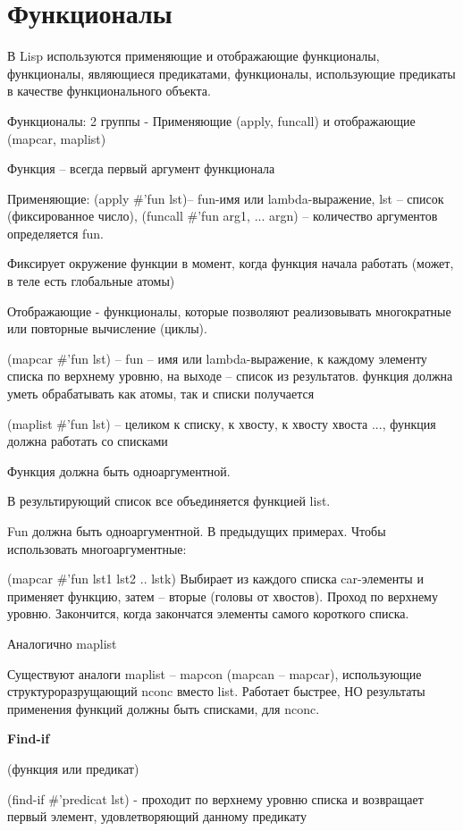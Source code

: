 \documentclass[12pt]{report}
\begin{document}
\section*{Функционалы}
 В Lisp используются применяющие и отображающие функционалы, функционалы, являющиеся предикатами, функционалы, использующие предикаты в качестве функционального объекта.

Функционалы: 2 группы - Применяющие (apply,  funcall) и отображающие (mapcar, maplist)

Функция – всегда первый аргумент функционала



Применяющие: (apply \#'fun lst)--  fun-имя или lambda-выражение, lst -- список (фиксированное число), (funcall \#'fun arg1, ... argn) -- количество аргументов определяется fun.

Фиксирует окружение функции в момент, когда функция начала работать (может, в теле есть глобальные атомы)


Отображающие -  функционалы, которые позволяют реализовывать многократные или повторные вычисление (циклы).

(mapcar \#'fun lst) -- fun -- имя или lambda-выражение, к каждому элементу списка по верхнему уровню, на выходе -- список из результатов. функция должна уметь обрабатывать как атомы, так и списки получается

(maplist \#'fun lst) -- целиком к списку, к хвосту, к хвосту хвоста ..., функция должна работать со списками

Функция должна быть одноаргументной.

В результирующий список все объединяется функцией list. 

Fun должна быть одноаргументной. В предыдущих примерах. Чтобы использовать многоаргументные:

(mapcar \#’fun lst1 lst2 .. lstk)
Выбирает из каждого списка car-элементы и применяет функцию, затем – вторые (головы от хвостов). Проход по верхнему уровню. Закончится, когда закончатся элементы самого короткого списка. 

Аналогично maplist

Существуют аналоги maplist -- mapcon (mapcan -- mapcar), использующие структуроразрущающий nconc вместо list. Работает быстрее, НО результаты применения функций должны быть списками, для nconc.


\textbf{Find-if}

(функция или предикат)

(find-if  \#’predicat lst) - проходит по верхнему уровню списка и возвращает первый элемент, удовлетворяющий данному предикату
\end{document}
